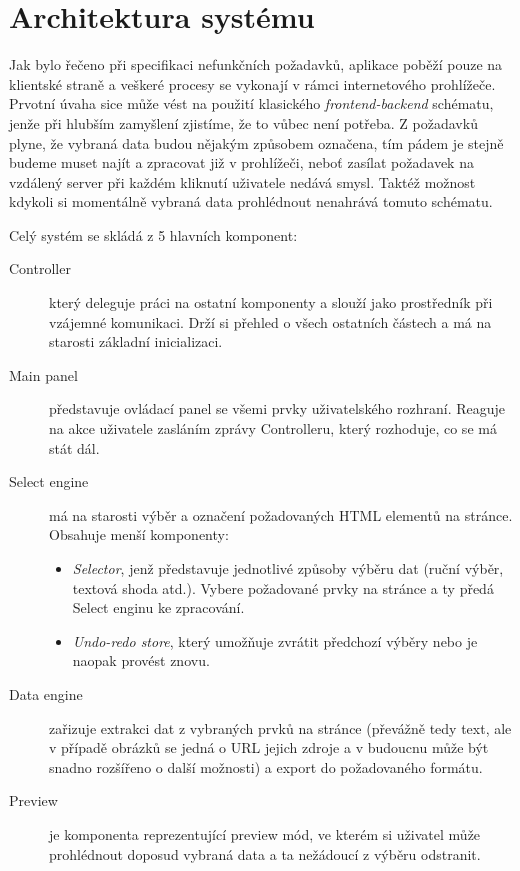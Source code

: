 \documentclass[thesis=B,czech]{FITthesis}[2012/06/26]
\begin{document}

\section{Architektura systému}
Jak bylo řečeno při specifikaci nefunkčních požadavků, aplikace poběží pouze na klientské straně a veškeré procesy se vykonají v rámci internetového prohlížeče. Prvotní úvaha sice může vést na použití klasického \textit{frontend-backend} schématu, jenže při hlubším zamyšlení zjistíme, že to vůbec není potřeba. Z požadavků plyne, že vybraná data budou nějakým způsobem označena, tím pádem je stejně budeme muset najít a zpracovat již v prohlížeči, neboť zasílat požadavek na vzdálený server při každém kliknutí uživatele nedává smysl. Taktéž možnost kdykoli si momentálně vybraná data prohlédnout nenahrává tomuto schématu.

Celý systém se skládá z 5 hlavních komponent:
\begin{description}
	\item [Controller] který deleguje práci na ostatní komponenty a slouží jako prostředník při vzájemné komunikaci. Drží si přehled o všech ostatních částech a má na starosti základní inicializaci.
	\item [Main panel] představuje ovládací panel se všemi prvky uživatelského rozhraní. Reaguje na akce uživatele zasláním zprávy Controlleru, který rozhoduje, co se má stát dál.
	\item [Select engine] má na starosti výběr a označení požadovaných HTML elementů na stránce. Obsahuje menší komponenty:
	\begin{itemize}
		\item \emph{Selector}, jenž představuje jednotlivé způsoby výběru dat (ruční výběr, textová shoda atd.). Vybere požadované prvky na stránce a ty předá Select enginu ke zpracování.
		\item \emph{Undo-redo store}, který umožňuje zvrátit předchozí výběry nebo je naopak provést znovu.
	\end{itemize}
	\item [Data engine] zařizuje extrakci dat z vybraných prvků na stránce (převážně tedy text, ale v případě obrázků se jedná o URL jejich zdroje a v budoucnu může být snadno rozšířeno o další možnosti) a export do požadovaného formátu.
	\item [Preview] je komponenta reprezentující preview mód, ve kterém si uživatel může prohlédnout doposud vybraná data a ta nežádoucí z výběru odstranit.
\end{description}
\end{document}
